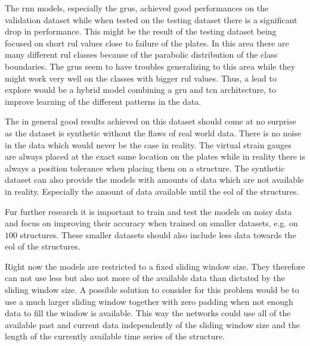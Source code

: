 \documentclass[conference]{IEEEtran}
\begin{document}
The \gls{rnn} models, especially the \glspl{gru}, achieved good performances on the validation dataset while when tested on the testing dataset there is a significant drop in performance. This might be the result of the testing dataset being focused on short \gls{rul} values close to failure of the plates. In this area there are many different \gls{rul} classes because of the parabolic distribution of the class boundaries. The \glspl{gru} seem to have troubles generalizing to this area while they might work very well on the classes with bigger \gls{rul} values. Thus, a lead to explore would be a hybrid model combining a \gls{gru} and \gls{tcn} architecture, to improve learning of the different patterns in the data.

The in general good results achieved on this dataset should come at no surprise as the dataset is synthetic without the flaws of real world data. There is no noise in the data which would never be the case in reality. The virtual strain gauges are always placed at the exact same location on the plates while in reality there is always a position tolerance when placing them on a structure. The synthetic dataset can also provide the models with amounts of data which are not available in reality. Especially the amount of data available until the \gls{eol} of the structures.

Fur further research it is important to train and test the models on noisy data and focus on improving their accuracy when trained on smaller datasets, e.g. on $ 100 $ structures. These smaller datasets should also include less data towards the \gls{eol} of the structures.

Right now the models are restricted to a fixed sliding window size. They therefore can not use less but also not more of the available data than dictated by the sliding window size. A possible solution to consider for this problem would be to use a much larger sliding window together with zero padding when not enough data to fill the window is available. This way the networks could use all of the available past and current data independently of the sliding window size and the length of the currently available time series of the structure.

\printbibliography
\end{document}

